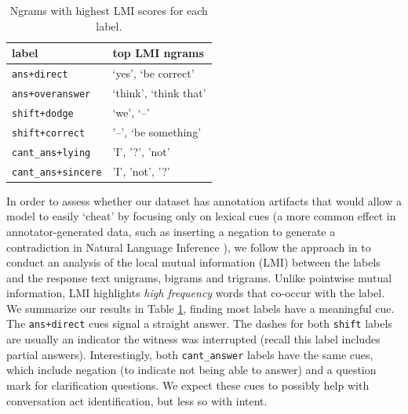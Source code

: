 \begin{table}[t]
\centering
\small
\begin{tabular}{ll}
\toprule
label  & top LMI ngrams\\ 
\midrule
\texttt{ans+direct}  &`yes', `be correct'  \\
\texttt{ans+overanswer} &`think', `think that' \\
\texttt{shift+dodge} &`we', `--'\\
\texttt{shift+correct} &'--', `be something'\\
\texttt{cant\_ans+lying} &'I', '?', 'not'\\
\texttt{cant\_ans+sincere} &'I', 'not', '?'\\
\bottomrule
\end{tabular}
\caption{Ngrams with highest LMI scores for each label.}
\label{tab:subj_lmi}
\end{table}

In order to assess whether our dataset has annotation artifacts that would allow a model to easily `cheat' by focusing only on lexical cues (a more common effect in annotator-generated data, such as inserting a negation to generate a contradiction in Natural Language Inference \cite{Gururangan:2018}), we follow the approach in  to conduct an analysis of the local mutual information (LMI) between the labels and the response text unigrams, bigrams and trigrams. Unlike pointwise mutual information, LMI highlights \emph{high frequency} words that co-occur with the label. We summarize our results in Table \ref{tab:subj_lmi}, finding most labels have a meaningful cue. The \texttt{ans+direct} cues signal a straight answer. The dashes for both \texttt{shift} labels are usually an indicator the witness was interrupted (recall this label includes partial answers). Interestingly, both \texttt{cant\_answer} labels have the same cues, which include negation (to indicate not being able to answer) and a question mark for clarification questions. We expect these cues to possibly help with conversation act identification, but less so with intent.
